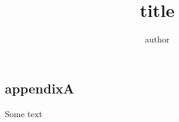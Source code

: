 \documentclass{book}
\title{title}
\author{author}
\begin{document}
\maketitle

\tableofcontents
\newpage



\begin{appendices}
\noappendicestocpagenum
\addappheadtotoc

\chapter{appendixA}
Some text
\end{appendices}




\end{document}
